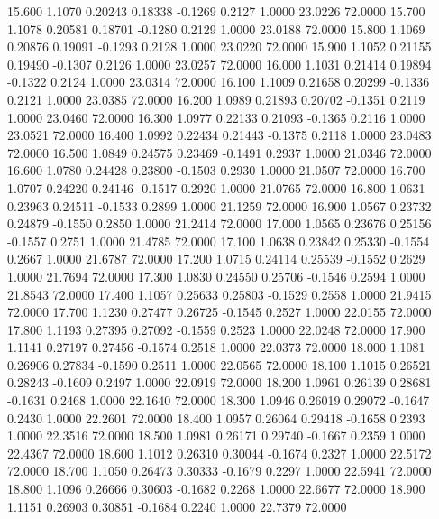   15.600   1.1070   0.20243   0.18338  -0.1269   0.2127   1.0000  23.0226  72.0000
  15.700   1.1078   0.20581   0.18701  -0.1280   0.2129   1.0000  23.0188  72.0000
  15.800   1.1069   0.20876   0.19091  -0.1293   0.2128   1.0000  23.0220  72.0000
  15.900   1.1052   0.21155   0.19490  -0.1307   0.2126   1.0000  23.0257  72.0000
  16.000   1.1031   0.21414   0.19894  -0.1322   0.2124   1.0000  23.0314  72.0000
  16.100   1.1009   0.21658   0.20299  -0.1336   0.2121   1.0000  23.0385  72.0000
  16.200   1.0989   0.21893   0.20702  -0.1351   0.2119   1.0000  23.0460  72.0000
  16.300   1.0977   0.22133   0.21093  -0.1365   0.2116   1.0000  23.0521  72.0000
  16.400   1.0992   0.22434   0.21443  -0.1375   0.2118   1.0000  23.0483  72.0000
  16.500   1.0849   0.24575   0.23469  -0.1491   0.2937   1.0000  21.0346  72.0000
  16.600   1.0780   0.24428   0.23800  -0.1503   0.2930   1.0000  21.0507  72.0000
  16.700   1.0707   0.24220   0.24146  -0.1517   0.2920   1.0000  21.0765  72.0000
  16.800   1.0631   0.23963   0.24511  -0.1533   0.2899   1.0000  21.1259  72.0000
  16.900   1.0567   0.23732   0.24879  -0.1550   0.2850   1.0000  21.2414  72.0000
  17.000   1.0565   0.23676   0.25156  -0.1557   0.2751   1.0000  21.4785  72.0000
  17.100   1.0638   0.23842   0.25330  -0.1554   0.2667   1.0000  21.6787  72.0000
  17.200   1.0715   0.24114   0.25539  -0.1552   0.2629   1.0000  21.7694  72.0000
  17.300   1.0830   0.24550   0.25706  -0.1546   0.2594   1.0000  21.8543  72.0000
  17.400   1.1057   0.25633   0.25803  -0.1529   0.2558   1.0000  21.9415  72.0000
  17.700   1.1230   0.27477   0.26725  -0.1545   0.2527   1.0000  22.0155  72.0000
  17.800   1.1193   0.27395   0.27092  -0.1559   0.2523   1.0000  22.0248  72.0000
  17.900   1.1141   0.27197   0.27456  -0.1574   0.2518   1.0000  22.0373  72.0000
  18.000   1.1081   0.26906   0.27834  -0.1590   0.2511   1.0000  22.0565  72.0000
  18.100   1.1015   0.26521   0.28243  -0.1609   0.2497   1.0000  22.0919  72.0000
  18.200   1.0961   0.26139   0.28681  -0.1631   0.2468   1.0000  22.1640  72.0000
  18.300   1.0946   0.26019   0.29072  -0.1647   0.2430   1.0000  22.2601  72.0000
  18.400   1.0957   0.26064   0.29418  -0.1658   0.2393   1.0000  22.3516  72.0000
  18.500   1.0981   0.26171   0.29740  -0.1667   0.2359   1.0000  22.4367  72.0000
  18.600   1.1012   0.26310   0.30044  -0.1674   0.2327   1.0000  22.5172  72.0000
  18.700   1.1050   0.26473   0.30333  -0.1679   0.2297   1.0000  22.5941  72.0000
  18.800   1.1096   0.26666   0.30603  -0.1682   0.2268   1.0000  22.6677  72.0000
  18.900   1.1151   0.26903   0.30851  -0.1684   0.2240   1.0000  22.7379  72.0000
